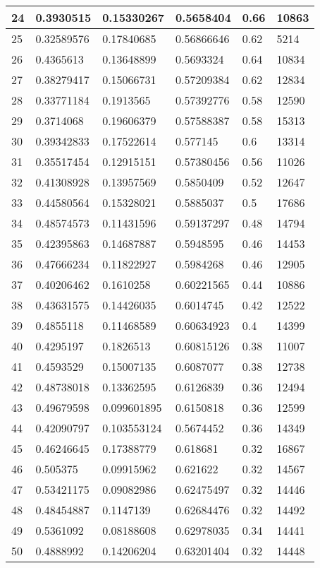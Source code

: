 \begin{longtable}{|l|l|l|l|l|l|}
24 & 0.3930515 & 0.15330267 & 0.5658404 & 0.66 & 10863 \\ \hline 
25 & 0.32589576 & 0.17840685 & 0.56866646 & 0.62 & 5214 \\ \hline 
26 & 0.4365613 & 0.13648899 & 0.5693324 & 0.64 & 10834 \\ \hline 
27 & 0.38279417 & 0.15066731 & 0.57209384 & 0.62 & 12834 \\ \hline 
28 & 0.33771184 & 0.1913565 & 0.57392776 & 0.58 & 12590 \\ \hline 
29 & 0.3714068 & 0.19606379 & 0.57588387 & 0.58 & 15313 \\ \hline 
30 & 0.39342833 & 0.17522614 & 0.577145 & 0.6 & 13314 \\ \hline 
31 & 0.35517454 & 0.12915151 & 0.57380456 & 0.56 & 11026 \\ \hline 
32 & 0.41308928 & 0.13957569 & 0.5850409 & 0.52 & 12647 \\ \hline 
33 & 0.44580564 & 0.15328021 & 0.5885037 & 0.5 & 17686 \\ \hline 
34 & 0.48574573 & 0.11431596 & 0.59137297 & 0.48 & 14794 \\ \hline 
35 & 0.42395863 & 0.14687887 & 0.5948595 & 0.46 & 14453 \\ \hline 
36 & 0.47666234 & 0.11822927 & 0.5984268 & 0.46 & 12905 \\ \hline 
37 & 0.40206462 & 0.1610258 & 0.60221565 & 0.44 & 10886 \\ \hline 
38 & 0.43631575 & 0.14426035 & 0.6014745 & 0.42 & 12522 \\ \hline 
39 & 0.4855118 & 0.11468589 & 0.60634923 & 0.4 & 14399 \\ \hline 
40 & 0.4295197 & 0.1826513 & 0.60815126 & 0.38 & 11007 \\ \hline 
41 & 0.4593529 & 0.15007135 & 0.6087077 & 0.38 & 12738 \\ \hline 
42 & 0.48738018 & 0.13362595 & 0.6126839 & 0.36 & 12494 \\ \hline 
43 & 0.49679598 & 0.099601895 & 0.6150818 & 0.36 & 12599 \\ \hline 
44 & 0.42090797 & 0.103553124 & 0.5674452 & 0.36 & 14349 \\ \hline 
45 & 0.46246645 & 0.17388779 & 0.618681 & 0.32 & 16867 \\ \hline 
46 & 0.505375 & 0.09915962 & 0.621622 & 0.32 & 14567 \\ \hline 
47 & 0.53421175 & 0.09082986 & 0.62475497 & 0.32 & 14446 \\ \hline 
48 & 0.48454887 & 0.1147139 & 0.62684476 & 0.32 & 14492 \\ \hline 
49 & 0.5361092 & 0.08188608 & 0.62978035 & 0.34 & 14441 \\ \hline 
50 & 0.4888992 & 0.14206204 & 0.63201404 & 0.32 & 14448 \\ \hline 
\end{longtable}